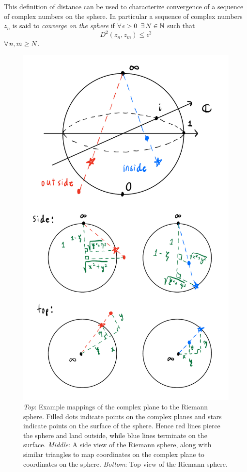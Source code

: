 This definition of distance can be used to characterize convergence of a
sequence of complex numbers on the sphere. In particular 
a sequence of complex numbers $z_n$ is said to
{\it converge on the sphere} if $\operatorname{\forall}\epsilon>0$ $\operatorname{\exists} N\in\mathbb{N}$
such that
\begin{equation}
  D^2(z_n,z_m)\leq\epsilon^2
\end{equation}
$\operatorname{\forall} n,m\geq N$.

\begin{figure}
\centering
\includegraphics[width=0.7\linewidth]{figs/riemann.pdf}
\caption{{\it Top}: Example mappings of the complex plane to the Riemann sphere.
Filled dots indicate points on the complex planes and stars indicate points on
the surface of the sphere. Hence red lines pierce the sphere and land outside,
while blue lines terminate on the surface. {\it Middle}: A side view of the
Riemann sphere, along with similar triangles to map coordinates on the complex
plane to coordinates on the sphere. {\it Bottom}: Top view of the Riemann
sphere.}
\label{fig:riemann}
\end{figure}


